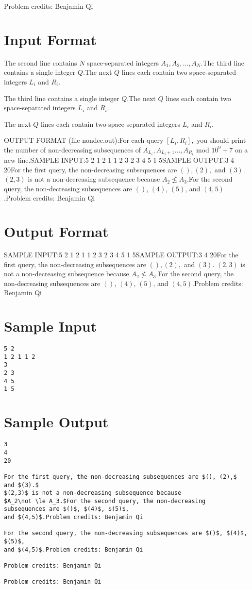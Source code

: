 \documentclass[12pt]{article}
\begin{document}
Problem credits: Benjamin Qi



\section*{Input Format}
The second line contains $N$ space-separated integers $A_1,A_2,\ldots, A_N$.The third line contains a single integer $Q.$The next $Q$ lines each contain two space-separated integers $L_i$ and $R_i.$

The third line contains a single integer $Q.$The next $Q$ lines each contain two space-separated integers $L_i$ and $R_i.$

The next $Q$ lines each contain two space-separated integers $L_i$ and $R_i.$

OUTPUT FORMAT (file nondec.out):For each query $[L_i,R_i],$ you should print the number of non-decreasing
subsequences of $A_{L_i},A_{L_i+1}\ldots, A_{R_i}$ mod $10^9+7$ on a new line.SAMPLE INPUT:5 2
1 2 1 1 2
3
2 3
4 5
1 5SAMPLE OUTPUT:3
4
20For the first query, the non-decreasing subsequences are $(), (2),$ and $(3).$
$(2,3)$ is not a non-decreasing subsequence because
$A_2\not \le A_3.$For the second query, the non-decreasing subsequences are $()$, $(4)$, $(5)$,
and $(4,5)$.Problem credits: Benjamin Qi

\section*{Output Format}
SAMPLE INPUT:5 2
1 2 1 1 2
3
2 3
4 5
1 5SAMPLE OUTPUT:3
4
20For the first query, the non-decreasing subsequences are $(), (2),$ and $(3).$
$(2,3)$ is not a non-decreasing subsequence because
$A_2\not \le A_3.$For the second query, the non-decreasing subsequences are $()$, $(4)$, $(5)$,
and $(4,5)$.Problem credits: Benjamin Qi

\section*{Sample Input}
\begin{verbatim}
5 2
1 2 1 1 2
3
2 3
4 5
1 5
\end{verbatim}

\section*{Sample Output}
\begin{verbatim}
3
4
20

For the first query, the non-decreasing subsequences are $(), (2),$ and $(3).$
$(2,3)$ is not a non-decreasing subsequence because
$A_2\not \le A_3.$For the second query, the non-decreasing subsequences are $()$, $(4)$, $(5)$,
and $(4,5)$.Problem credits: Benjamin Qi

For the second query, the non-decreasing subsequences are $()$, $(4)$, $(5)$,
and $(4,5)$.Problem credits: Benjamin Qi

Problem credits: Benjamin Qi

Problem credits: Benjamin Qi
\end{verbatim}
\end{document}
